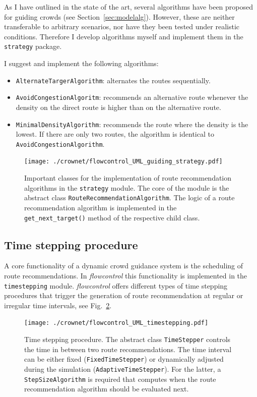 As I have outlined in the state of the art, several algorithms have been proposed for guiding crowds (see Section~\ref{sec:modelalg}). However, these are neither transferable to arbitrary scenarios, nor have they been tested under realistic conditions. Therefore I develop algorithms myself and implement them in the \lstinline{strategy} package. 

I suggest and implement the following algorithms:
\begin{itemize}
\item \lstinline{AlternateTargerAlgorithm}: alternates the routes sequentially.
\item \lstinline{AvoidCongestionAlgoritm}: recommends an alternative route whenever the density on the direct route is higher than on the alternative route.
\item \lstinline{MinimalDensityAlgorithm}: recommends the route where the density is the lowest. If there are only two routes, the algorithm is identical to \lstinline{AvoidCongestionAlgorithm}.
\end{itemize}


\begin{figure}[hbt!]
\texttt{[image: ./crownet/flowcontrol\_UML\_guiding\_strategy.pdf]} 
\caption{Important classes for the implementation of route recommendation algorithms in the \lstinline{strategy} module. The core of the module is the abstract class \lstinline{RouteRecommendationAlgorithm}. The logic of a route recommendation algorithm is implemented in the \lstinline{get_next_target()} method of the respective child class.  }
\label{fig:routerecommalg}
\end{figure}



\subsection{Time stepping procedure }

\label{sec:timestepping} 

A core functionality of a dynamic crowd guidance system is the scheduling of route recommendations. In \textit{flowcontrol} this functionality is implemented in the \lstinline{timestepping} module. \textit{flowcontrol} offers different types of time stepping procedures that trigger the generation of route recommendation at regular or irregular time intervals, see Fig.~\ref{fig:timestepper}. 




\begin{figure}[hbt!]
\texttt{[image: ./crownet/flowcontrol\_UML\_timestepping.pdf]} 
\caption[flowcontrol: Implementation of the time stepping]{
Time stepping procedure. The abstract class \lstinline{TimeStepper} controls the time in between two route recommendations. The time interval can be either fixed (\lstinline{FixedTimeStepper}) or dynamically adjusted during the simulation (\lstinline{AdaptiveTimeStepper}). For the latter, a \lstinline{StepSizeAlgorithm} is required that computes when the route recommendation algorithm should be evaluated next. }
\label{fig:timestepper}
\end{figure}

